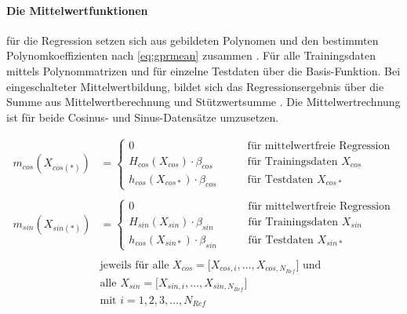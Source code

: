 \clearpage


\paragraph*{Die Mittelwertfunktionen} für die Regression setzen sich aus gebildeten Polynomen und den bestimmten Polynomkoeffizienten nach \autoref{eq:gprmean} zusammen \cite{Rasmussen2006}. Für alle Trainingsdaten mittels Polynommatrizen und für einzelne Testdaten über die Basis-Funktion. Bei eingeschalteter Mittelwertbildung, bildet sich das Regressionsergebnis über die Summe aus Mittelwertberechnung und Stützwertsumme \cite{Rasmussen2006}. Die Mittelwertrechnung ist für beide Cosinus- und Sinus-Datensätze umzusetzen. 


\begin{align}\label{eq:gprmean}
	m_{cos}(X_{cos(*)}) &=
		\begin{cases}
			0                                    &\qquad \text{für mittelwertfreie Regression} \\
			H_{cos}(X_{cos}) \cdot \beta_{cos} 	 &\qquad \text{für Trainingsdaten } X_{cos} \\
			h_{cos}(X_{cos*}) \cdot \beta_{cos} &\qquad \text{für Testdaten } X_{cos*}
		\end{cases} \nonumber \\
	\\
	m_{sin}(X_{sin(*)}) &=
		\begin{cases}
			0                                    &\qquad \text{für mittelwertfreie Regression} \\
			H_{sin}(X_{sin}) \cdot \beta_{sin} 	 &\qquad \text{für Trainingsdaten } X_{sin} \\
			h_{cos}(X_{sin*}) \cdot \beta_{sin} &\qquad \text{für Testdaten } X_{sin*}
		\end{cases} \nonumber \\
	\nonumber \\
& \text{jeweils für alle } X_{cos} = \big[ X_{cos,i},\dots, X_{cos,N_{Ref}} \big] \text{ und } \nonumber \\
& \text{alle } X_{sin} = \big[ X_{sin,i},\dots, X_{sin,N_{Ref}} \big] \nonumber \\
& \text{mit } i = 1,2,3,\ldots,N_{Ref} \nonumber
\end{align}


\clearpage


